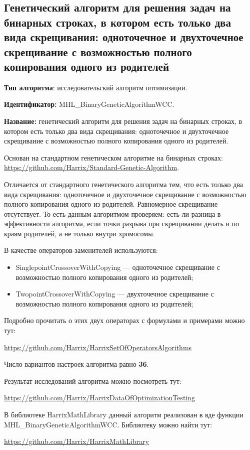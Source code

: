 \subsection{Генетический алгоритм для решения задач на бинарных строках, в котором есть только два вида скрещивания: одноточечное и двухточечное скрещивание с возможностью полного копирования одного из родителей}\label{HarrixOptimizationAlgorithms:MHL_BinaryGeneticAlgorithmWCC}

\textbf{Тип алгоритма}: исследовательский алгоритм оптимизации.

\textbf{Идентификатор:} MHL\_BinaryGeneticAlgorithmWCC.

\textbf{Название:} генетический алгоритм для решения задач на бинарных строках, в котором есть только два вида скрещивания: одноточечное и двухточечное скрещивание с возможностью полного копирования одного из родителей.

Основан на стандартном генетическом алгоритме на бинарных строках:  \href{https://github.com/Harrix/Standard-Genetic-Algorithm}{https://github.com/Harrix/Standard-Genetic-Algorithm}. 

Отличается от стандартного генетического алгоритма тем, что есть только два вида скрещивания: одноточечное и двухточечное скрещивание с возможностью полного копирования одного из родителей. Равномерное скрещивание отсутствует. То есть данным алгоритмом проверяем: есть ли разница в эффективности алгоритма, если точки разрыва при скрещивании делать и по краям родителей, а не только внутри хромосомы.

В качестве операторов-заменителей используются:
\begin{itemize}
\item SinglepointCrossoverWithCopying --- одноточечное скрещивание с возможностью полного копирования одного из родителей;
\item TwopointCrossoverWithCopying --- двухточечное скрещивание с возможностью полного копирования одного из родителей;
\end{itemize}

Подробно прочитать о этих двух операторах с формулами и примерами можно тут:

\href{https://github.com/Harrix/HarrixSetOfOperatorsAlgorithms}{https://github.com/Harrix/HarrixSetOfOperatorsAlgorithms}

Число вариантов настроек алгоритма равно \textbf{36}.

Результат исследований алгоритма можно посмотреть тут:

\href{https://github.com/Harrix/HarrixDataOfOptimizationTesting}{https://github.com/Harrix/HarrixDataOfOptimizationTesting}

В библиотеке HarrixMathLibrary данный алгоритм реализован в вде функции MHL\_BinaryGeneticAlgorithmWCC. Библиотеку можно найти тут:

\href{https://github.com/Harrix/HarrixMathLibrary}{https://github.com/Harrix/HarrixMathLibrary}